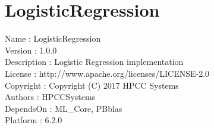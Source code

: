 \chapter*{LogisticRegression}
\hypertarget{ecldoc:toc:LogisticRegression}{}

Name : LogisticRegression \\
Version : 1.0.0 \\
Description : Logistic Regression implementation \\
License : http://www.apache.org/licenses/LICENSE-2.0 \\
Copyright : Copyright (C) 2017 HPCC Systems \\
Authors : HPCCSystems \\
DependsOn : ML\_Core, PBblas \\
Platform : 6.2.0 \\

